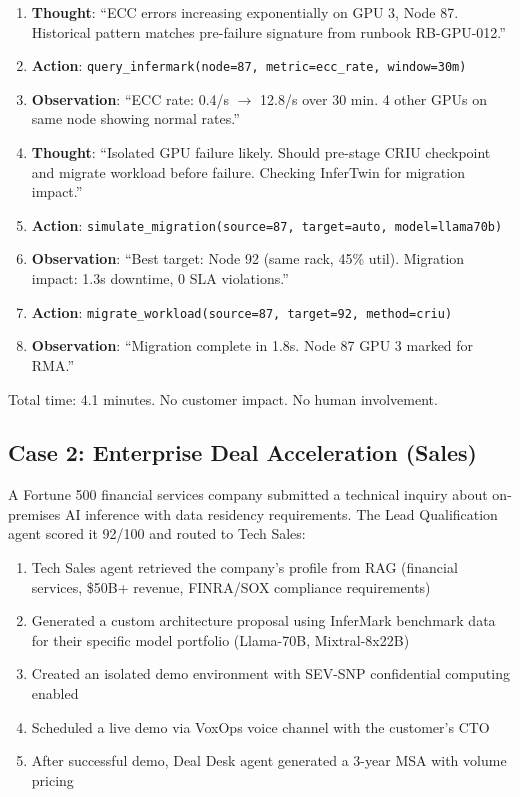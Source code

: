 \documentclass[conference,10pt,letterpaper]{IEEEtran}
\begin{document}
\begin{enumerate}
\item \textbf{Thought}: ``ECC errors increasing exponentially on GPU 3, Node 87. Historical pattern matches pre-failure signature from runbook RB-GPU-012.''
\item \textbf{Action}: \texttt{query\_infermark(node=87, metric=ecc\_rate, window=30m)}
\item \textbf{Observation}: ``ECC rate: 0.4/s $\to$ 12.8/s over 30 min. 4 other GPUs on same node showing normal rates.''
\item \textbf{Thought}: ``Isolated GPU failure likely. Should pre-stage CRIU checkpoint and migrate workload before failure. Checking InferTwin for migration impact.''
\item \textbf{Action}: \texttt{simulate\_migration(source=87, target=auto, model=llama70b)}
\item \textbf{Observation}: ``Best target: Node 92 (same rack, 45\% util). Migration impact: 1.3s downtime, 0 SLA violations.''
\item \textbf{Action}: \texttt{migrate\_workload(source=87, target=92, method=criu)}
\item \textbf{Observation}: ``Migration complete in 1.8s. Node 87 GPU 3 marked for RMA.''
\end{enumerate}

Total time: 4.1 minutes. No customer impact. No human involvement.

\subsection{Case 2: Enterprise Deal Acceleration (Sales)}

A Fortune 500 financial services company submitted a technical inquiry about on-premises AI inference with data residency requirements. The Lead Qualification agent scored it 92/100 and routed to Tech Sales:

\begin{enumerate}
\item Tech Sales agent retrieved the company's profile from RAG (financial services, \$50B+ revenue, FINRA/SOX compliance requirements)
\item Generated a custom architecture proposal using InferMark benchmark data for their specific model portfolio (Llama-70B, Mixtral-8x22B)
\item Created an isolated demo environment with SEV-SNP confidential computing enabled
\item Scheduled a live demo via VoxOps voice channel with the customer's CTO
\item After successful demo, Deal Desk agent generated a 3-year MSA with volume pricing
\end{enumerate}
\end{document}
